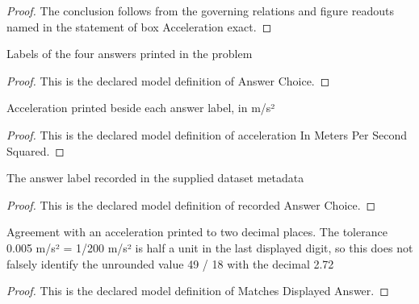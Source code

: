 \begin{proof}
  The conclusion follows from the governing relations and figure readouts named in the statement of box Acceleration exact.
\end{proof}
\begin{definition}
  \label{def:physics:phyx-mini-0778:phyxminiproblems-problemphyxmini0778-answerchoice}
  Labels of the four answers printed in the problem
\end{definition}
\begin{proof}
  This is the declared model definition of Answer Choice.
\end{proof}
\begin{definition}
  \label{def:physics:phyx-mini-0778:phyxminiproblems-problemphyxmini0778-answerchoice-accelerationinmeterspersecondsquared}
  Acceleration printed beside each answer label, in m/s²
\end{definition}
\begin{proof}
  This is the declared model definition of acceleration In Meters Per Second Squared.
\end{proof}
\begin{definition}
  \label{def:physics:phyx-mini-0778:phyxminiproblems-problemphyxmini0778-recordedanswerchoice}
  The answer label recorded in the supplied dataset metadata
\end{definition}
\begin{proof}
  This is the declared model definition of recorded Answer Choice.
\end{proof}
\begin{definition}
  \label{def:physics:phyx-mini-0778:phyxminiproblems-problemphyxmini0778-matchesdisplayedanswer}
  Agreement with an acceleration printed to two decimal places. The tolerance 0.005 m/s² = 1/200 m/s² is half a unit in the last displayed digit, so this does not falsely identify the unrounded value 49 / 18 with the decimal 2.72
\end{definition}
\begin{proof}
  This is the declared model definition of Matches Displayed Answer.
\end{proof}
